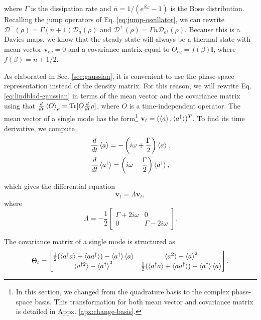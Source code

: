\noindent where $\Gamma$ is the dissipation rate and $\bar{n} = 1/(e^{\beta \omega} - 1)$ is the Bose distribution. Recalling the jump operators of Eq. \eqref{eq:jump-oscillator}, we can rewrite $\mathcal{D}^-({\rho})= \Gamma (\bar{n}+1) \mathcal{D}_a({\rho})$ and $\mathcal{D}^+({\rho})= \Gamma \bar{n}\mathcal{D}_{a^\dagger} ({\rho})$. Because this is a Davies maps, we know that the steady state will always be a thermal state with mean vector $\mathbf{v}_{eq} = 0$ and a covariance matrix equal to $\Theta_{eq} = f(\beta) \mathbb{I}$, where $f(\beta) = \bar{n} + 1/2$.

As elaborated in Sec. \ref{sec:gaussian}, it is convenient to use the phase-space representation instead of the density matrix. For this reason, we will rewrite Eq. \eqref{eq:lindblad-gaussian} in terms of the mean vector and the covariance matrix using that $\frac{d}{dt} \braket{O}_\rho = \text{Tr}[O \frac{d}{dt}\rho]$, where $O$ is a time-independent operator. The mean vector of a single mode has the form\footnote{In this section, we changed from the quadrature basis to the complex phase-space basis. This transformation for both mean vector and covariance matrix is detailed in Appx. \ref{apx:change-basis}.} $\mathbf{v}_t = (\braket{{a}}, \braket{{a}^\dagger})^T$. To find its time derivative, we compute
\begin{align}
    &\frac{d}{dt}\braket{{a}} = -\left( i\omega + \frac{\Gamma}{2} \right) \braket{{a}},\\
    &\frac{d}{dt}\braket{{a}^\dagger} = \left( i\omega - \frac{\Gamma}{2} \right) \braket{{a}^\dagger},
\end{align}

\noindent which gives the differential equation 
\begin{equation}
    \dot{\mathbf{v}}_t = \Lambda \mathbf{v}_t,
    \label{eq:dt-mean-vector}
\end{equation}
\noindent where
\begin{equation}
    \Lambda = -\frac{1}{2}
    \begin{bmatrix}
        \Gamma + 2i\omega & 0\\
        0 & \Gamma - 2i\omega
    \end{bmatrix}.
\end{equation}

\noindent The covariance matrix of a single mode is structured as
\begin{equation}
    \Theta_t =
    \begin{bmatrix}
        \frac{1}{2}(\braket{{a}^\dagger {a}} + \braket{{a} {a}^\dagger}) - \braket{{a}^\dagger} \braket{{a}} & \braket{{a}^2} - \braket{{a}}^2\\
        \braket{{a}^{\dagger 2}} - \braket{{a}^\dagger}^2 & \frac{1}{2}(\braket{{a}^\dagger {a}} + \braket{{a} {a}^\dagger}) - \braket{{a}^\dagger} \braket{{a}}
    \end{bmatrix}.
\end{equation}


